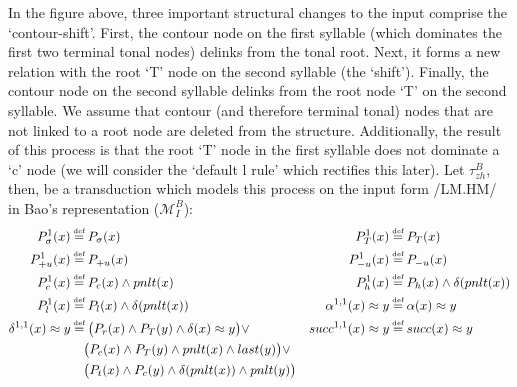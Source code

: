 \documentclass{article}
\newcommand\myeq{\mathrel{\stackrel{\makebox[0pt]{\mbox{\normalfont\tiny def}}}{=}}}
\newcommand{\ap}{\approx}
\begin{document}
\begin{center}
\end{center}
In the figure above, three important structural changes to the input comprise the `contour-shift'. First, the contour node on the first syllable (which dominates the first two terminal tonal nodes) delinks from the tonal root. Next, it forms a new relation with the root `T' node on the second syllable (the `shift'). Finally, the contour node on the second syllable delinks from the root node `T' on the second syllable. We assume that contour (and therefore terminal tonal) nodes that are not linked to a root node are deleted from the structure. Additionally, the result of this process is that the root `T' node in the first syllable does not dominate a `c' node (we will consider the `default l rule' which rectifies this later). Let $\tau^{B}_{zh}$, then, be a transduction which models this process on the input form /LM.HM/ in Bao's representation ($\mathcal{M}^{B}_{I}$):
\begin{equation}
\begin{aligned}
P^1_{\sigma}(x)&\myeq P_{\sigma}(x) & P^1_{T}(x)&\myeq P_{T}(x) \\
P^1_{+u}(x)&\myeq P_{+u}(x) & P^1_{-u}(x)&\myeq P_{-u}(x) \\
P^1_{c}(x)&\myeq P_{c}(x)\land pnlt(x) & P^1_{h}(x)&\myeq P_{h}(x)\land \delta(pnlt(x)) \\
P^1_{l}(x)&\myeq P_{l}(x)\land \delta(pnlt(x)) & \alpha^{1,1}(x)\ap y&\myeq \alpha(x)\ap y \\
\delta^{1,1}(x)\ap y &\myeq \big(P_{r}(x)\land P_{T}(y)\land \delta(x)\ap y\big) \lor & succ^{1,1}(x)\ap y &\myeq succ(x)\ap y \\
&\quad \big(P_{c}(x)\land P_{T}(y)\land pnlt(x) \land last(y)\big)\lor \\
&\quad \big(P_{t}(x)\land P_{c}(y)\land \delta(pnlt(x))\land pnlt(y)\big) \\
\end{aligned}
\end{equation}
\end{document}
